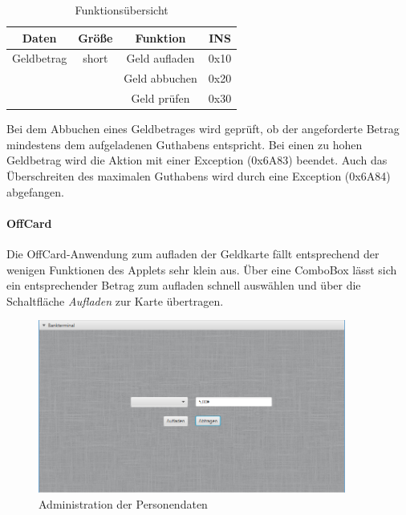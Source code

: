 \documentclass[	a4paper,
			11pt,
			oneside,
			parskip]{scrartcl}
\begin{document}
\begin{table}[H]
  \centering
  \caption{Funktionsübersicht}
    \begin{tabular}{crcc}
    \toprule
    \textbf{Daten} & \multicolumn{1}{c}{\textbf{Größe}} & \textbf{Funktion} & \textbf{INS} \\
    \midrule
    Geldbetrag & \multicolumn{1}{c}{short} & Geld aufladen & 0x10 \\
          & \multicolumn{1}{c}{} & Geld abbuchen & 0x20 \\
          & \multicolumn{1}{c}{} & Geld prüfen & 0x30 \\
    \bottomrule
    \end{tabular}%
  \label{tab:walletdata}%
\end{table}%

Bei dem Abbuchen eines Geldbetrages wird geprüft, ob der angeforderte Betrag mindestens dem aufgeladenen Guthabens entspricht. Bei einen zu hohen Geldbetrag wird die Aktion mit einer Exception (0x6A83) beendet. Auch das Überschreiten des maximalen Guthabens wird durch eine Exception (0x6A84) abgefangen.

\paragraph{OffCard} Die OffCard-Anwendung zum aufladen der Geldkarte fällt entsprechend der wenigen Funktionen des Applets sehr klein aus. Über eine ComboBox lässt sich ein entsprechender Betrag zum aufladen schnell auswählen und über die Schaltfläche \textit{Aufladen} zur Karte übertragen. 

\begin{figure}[H]
	\centering
  	\includegraphics[width=0.9\textwidth]{img/wallet}
	\caption{Administration der Personendaten}
	\label{walletoff}
\end{figure}
\end{document}
